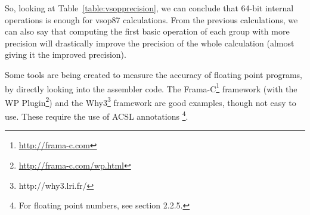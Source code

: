 So, looking at Table~\ref{table:vsopprecision}, we can conclude that 64-bit internal operations is enough for vsop87 calculations. From the previous calculations, we can also say that computing the first basic operation of each group with more precision will drastically improve the precision of the whole calculation (almost giving it the improved precision).




Some tools are being created to measure the accuracy of floating point programs, by directly looking into the assembler code. The Frama-C\footnote{\url{http://frama-c.com}} framework (with the WP Plugin\footnote{\url{http://frama-c.com/wp.html}}) and the Why3\footnote{http://why3.lri.fr/} framework are good examples, though not easy to use. These require the use of ACSL annotations \cite{ACSL}\footnote{For floating point numbers, see section 2.2.5.}.


